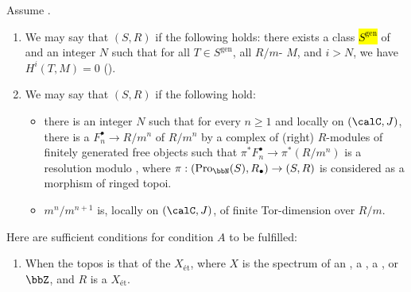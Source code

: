 \begin{definition}  \label{definition:ekedahls_condition_A_and_B}
    Assume .
   \begin{enumerate}
    \item We may say that $(S,R)$  if the following holds: there exists a class \hl{$S^{\text{gen}}$} of  and an integer $N$ such that for all $T \in S^{\text{gen}}$, all $R/m$- $M$, and $i > N$, we have $H^i(T,M) = 0$ ().

    \item We may say that $(S,R)$  if the following hold: 
    \begin{itemize}
        \item there is an integer $N$ such that for every $n \geq 1$ and locally on $(\calC, J)$, there is a  $F_n^\bullet \to R/m^n$ of $R/m^n$ by a complex of (right) $R$-modules of finitely generated free objects such that $\pi^* F_n^\bullet \to \pi^*(R/m^n)$ is a resolution modulo , where $\pi: (\mathrm{Pro}_{\bbN}(S), R_\bullet) \to (S,R)$ is considered as a morphism of ringed topoi. 

        \item $m^n/m^{n+1}$ is, locally on $(\calC, J)$, of finite Tor-dimension over $R/m$. 
    \end{itemize}

    
   \end{enumerate}  

   Here are sufficient conditions for condition $A$ to be fulfilled:
   \begin{enumerate}
    \item When the topos is that of the  $X_{\text{\'et}}$, where $X$ is the spectrum of an , a , a , or $\bbZ$, and $R$ is a  $X_{\text{\'et}}$.


\end{enumerate}
\end{definition}
